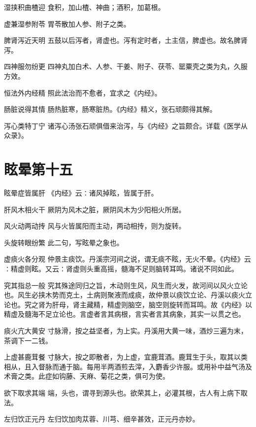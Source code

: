 \documentclass[a4paper,12pt,UTF8,twoside]{ctexbook}
\begin{document}
    湿挟积曲楂迎
    食积，加山楂、神曲；酒积，加葛根。
    
    虚兼湿参附苓
    胃苓散加人参、附子之类。
    
    脾肾泻近天明
    五鼓以后泻者，肾虚也。泻有定时者，土主信，脾虚也。故名脾肾泻。
    
    四神服勿纷更
    四神丸加白术、人参、干姜、附子、茯苓、罂粟壳之类为丸，久服方效。
    
    恒法外内经精
    照此法治而不愈者，宜求之《内经》。
    
    肠脏说得其情
    肠热脏寒，肠寒脏热。《内经》精义，张石顽颇得其解。
    
    泻心类特丁宁
    诸泻心汤张石顽俱借来治泻，与《内经》之旨颇合。详载《医学从众录》。
    
    
    
    \chapter{眩晕第十五}
    眩晕症皆属肝
    《内经》云∶诸风掉眩，皆属于肝。
    
    肝风木相火干
    厥阴为风木之脏，厥阴风木为少阳相火所居。
    
    风火动两动抟
    风与火皆属阳而主动，两动相抟，则为旋转。
    
    头旋转眼纷繁
    此二句，写眩晕之象也。
    
    虚痰火各分观
    仲景主痰饮。丹溪宗河间之说，谓无痰不眩，无火不晕。《内经》云∶精虚则眩。又云∶肾虚则头重高摇，髓海不足则脑转耳鸣。诸说不同如此。
    
    究其指总一般
    究其殊途同归之旨，木动则生风，风生而火发，故河间以风火立论也。风生必挟木势而克土，土病则聚液而成痰，故仲景以痰饮立论、丹溪以痰火立论也。究之肾为肝母，肾主藏精，精虚则脑空，脑空则旋转而耳鸣。故《内经》以精虚及髓海不足立论也。言虚者言其病根，言实者言其病象，其实一以贯之也。
    
    痰火亢大黄安
    寸脉滑，按之益坚者，为上实。丹溪用大黄一味，酒炒三遍为末，茶调下一二钱。
    
    上虚甚鹿茸餐
    寸脉大，按之即散者，为上虚，宜鹿茸酒。鹿茸生于头，取其以类相从，且入督脉而通于脑。每用半两酒煎去滓，入麝香少许服。或用补中益气汤及术膏之类。此症如钩藤、天麻、菊花之类，俱可为使。
    
    欲下取求其端
    端，头也，谓寻到源头也。欲荣其上，必灌其根，古人有上病下取法。
    
    左归饮正元丹
    左归饮加肉苁蓉、川芎、细辛甚效，正元丹亦妙。
    
    
    
\end{document}
